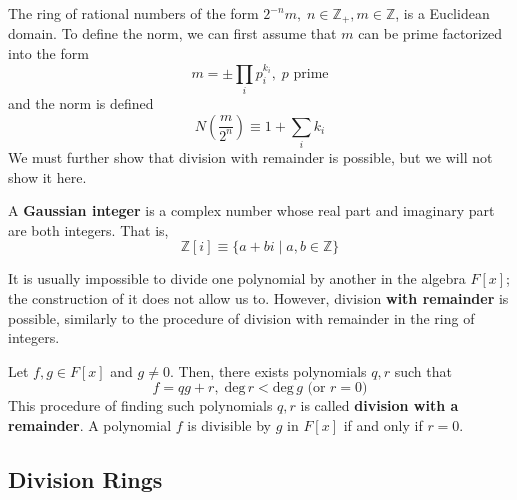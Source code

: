  \begin{example}
    The ring of rational numbers of the form $2^{-n} m, \; n \in \mathbb{Z}_+, m \in \mathbb{Z}$, is a Euclidean domain. To define the norm, we can first assume that $m$ can be prime factorized into the form 
    \begin{equation}
      m = \pm \prod_{i} p_{i}^{k_i}, \; p \text{ prime}
    \end{equation}
    and the norm is defined 
    \begin{equation}
      N(\frac{m}{2^n}) \equiv 1 + \sum_i k_i
    \end{equation}
    We must further show that division with remainder is possible, but we will not show it here. 
  \end{example}

  \begin{definition}
    A \textbf{Gaussian integer} is a complex number whose real part and imaginary part are both integers. That is, 
    \begin{equation}
      \mathbb{Z}[i] \equiv \{a + b i \;|\; a, b \in \mathbb{Z} \}
    \end{equation}
  \end{definition}

  It is usually impossible to divide one polynomial by another in the algebra $F[x]$; the construction of it does not allow us to. However, division \textbf{with remainder} is possible, similarly to the procedure of division with remainder in the ring of integers. 

  \begin{theorem}
    Let $f, g \in F[x]$ and $g \neq 0$. Then, there exists polynomials $q, r$ such that 
    \begin{equation}
      f = q g + r, \; \text{deg}\, r < \text{deg}\, g \text{ (or } r = 0 \text{)}
    \end{equation}
    This procedure of finding such polynomials $q, r$ is called \textbf{division with a remainder}. A polynomial $f$ is divisible by $g$ in $F[x]$ if and only if $r = 0$. 
  \end{theorem}

  \begin{theorem}
    
  \end{theorem}

\subsection{Division Rings}

